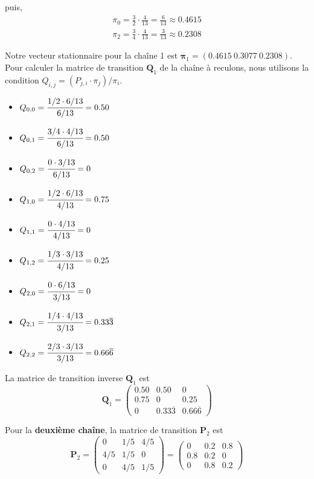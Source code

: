 \documentclass{article}
\begin{document}
puis,
\begin{gather}
    \pi_0=\frac{3}{2}\cdot\frac{4}{13}=\frac{6}{13}\approx0.4615 \\
    \pi_2=\frac{3}{4}\cdot\frac{4}{13}=\frac{3}{13}\approx0.2308
\end{gather}

Notre vecteur stationnaire pour la chaîne 1 est $\boldsymbol{\pi}_1=(0.4615\ 0.3077\ 0.2308)$. \\

\newpage
Pour calculer la matrice de transition $\boldsymbol{Q}_1$ de la chaîne à 
reculons, nous utilisons la condition $Q_{i,j}=(P_{j,i}\cdot\pi_j)/\pi_i$.
\begin{itemize}[left=1cm]
    \item $Q_{0,0}=\cfrac{1/2\cdot6/13}{6/13}=0.50$
    \item $Q_{0,1}=\cfrac{3/4\cdot4/13}{6/13}=0.50$
    \item $Q_{0,2}=\cfrac{0\cdot3/13}{6/13}=0$
    \item $Q_{1,0}=\cfrac{1/2\cdot6/13}{4/13}=0.75$
    \item $Q_{1,1}=\cfrac{0\cdot4/13}{4/13}=0$
    \item $Q_{1,2}=\cfrac{1/3\cdot3/13}{4/13}=0.25$
    \item $Q_{2,0}=\cfrac{0\cdot6/13}{3/13}=0$
    \item $Q_{2,1}=\cfrac{1/4\cdot4/13}{3/13}=0.33\overline{3}$
    \item $Q_{2,2}=\cfrac{2/3\cdot3/13}{3/13}=0.66\overline{6}$
\end{itemize}

La matrice de transition inverse $\boldsymbol{Q}_1$ est
\begin{equation}
    \boldsymbol{Q}_1=\begin{pmatrix}
        0.50 & 0.50 & 0 \\
        0.75 & 0 & 0.25 \\
        0 & 0.33\overline{3} & 0.66\overline{6}
    \end{pmatrix}
\end{equation}

\vspace{.5cm}
Pour la \textbf{deuxième chaîne}, la matrice de transition $\boldsymbol{P}_2$ est
\begin{equation}
    \boldsymbol{P}_2=\begin{pmatrix}
        0 & 1/5 & 4/5 \\
        4/5 & 1/5 & 0 \\
        0 & 4/5 & 1/5
    \end{pmatrix}=\begin{pmatrix}
        0 & 0.2 & 0.8 \\
        0.8 & 0.2 & 0 \\
        0 & 0.8 & 0.2
    \end{pmatrix}
\end{equation}
\end{document}
